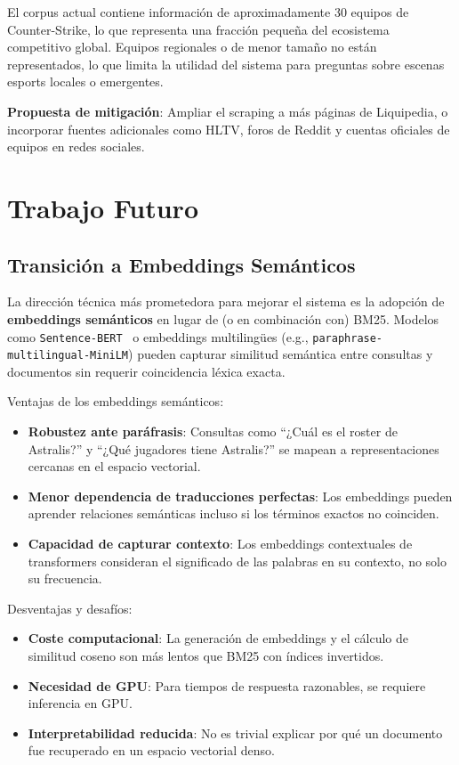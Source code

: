 El corpus actual contiene información de aproximadamente 30 equipos de Counter-Strike, lo que representa una fracción pequeña del ecosistema competitivo global. Equipos regionales o de menor tamaño no están representados, lo que limita la utilidad del sistema para preguntas sobre escenas esports locales o emergentes.

\textbf{Propuesta de mitigación}: Ampliar el scraping a más páginas de Liquipedia, o incorporar fuentes adicionales como HLTV, foros de Reddit y cuentas oficiales de equipos en redes sociales.

\section{Trabajo Futuro}

\subsection{Transición a Embeddings Semánticos}

La dirección técnica más prometedora para mejorar el sistema es la adopción de \textbf{embeddings semánticos} en lugar de (o en combinación con) BM25. Modelos como \texttt{Sentence-BERT}~\cite{reimers2019sentence} o embeddings multilingües (e.g., \texttt{paraphrase-multilingual-MiniLM}) pueden capturar similitud semántica entre consultas y documentos sin requerir coincidencia léxica exacta.

Ventajas de los embeddings semánticos:
\begin{itemize}
    \item \textbf{Robustez ante paráfrasis}: Consultas como \enquote{¿Cuál es el roster de Astralis?} y \enquote{¿Qué jugadores tiene Astralis?} se mapean a representaciones cercanas en el espacio vectorial.
    \item \textbf{Menor dependencia de traducciones perfectas}: Los embeddings pueden aprender relaciones semánticas incluso si los términos exactos no coinciden.
    \item \textbf{Capacidad de capturar contexto}: Los embeddings contextuales de transformers consideran el significado de las palabras en su contexto, no solo su frecuencia.
\end{itemize}

Desventajas y desafíos:
\begin{itemize}
    \item \textbf{Coste computacional}: La generación de embeddings y el cálculo de similitud coseno son más lentos que BM25 con índices invertidos.
    \item \textbf{Necesidad de GPU}: Para tiempos de respuesta razonables, se requiere inferencia en GPU.
    \item \textbf{Interpretabilidad reducida}: No es trivial explicar por qué un documento fue recuperado en un espacio vectorial denso.
\end{itemize}

